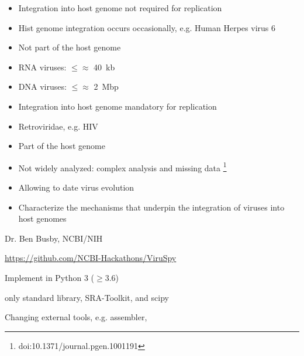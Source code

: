 \documentclass[final, a0paper, portrait]{baposter}
\newcommand{\compresslist}{
    \setlength{\itemsep}{1pt}
    \setlength{\parskip}{0pt}
    \setlength{\parsep}{0pt}
}
\begin{document}
\begin{poster}
{}
{
  \begin{minipage}{0.5\textwidth}
    \resizebox{0.7\linewidth}{!}{}
    \begin{itemize}
      \compresslist
      \item Integration into host genome not required for replication
      \item Hist genome integration occurs occasionally, e.g. Human Herpes virus 6
      \item Not part of the host genome
      \item RNA viruses: $\le \approx$ 40~kb
      \item DNA viruses: $\le \approx$ 2~Mbp
    \end{itemize}
  \end{minipage}
  \begin{minipage}{0.5\textwidth}
    \resizebox{0.7\linewidth}{!}{}
    \begin{itemize}
      \compresslist
      \item Integration into host genome mandatory for replication
      \item Retroviridae, e.g. HIV
      \item Part of the host genome
      \item Not widely analyzed: complex analysis and missing data
            \footnote{doi:10.1371/journal.pgen.1001191}
      \item Allowing to date virus evolution
      \item Characterize the mechanisms that underpin the integration of
            viruses into host genomes
    \end{itemize}
  \end{minipage}
}
{
  \begin{minipage}{0.6\textwidth}
    \begin{description}
      \compresslist
      \item[Collaboration] Dr. Ben Busby, NCBI/NIH
      \item[Built on ViruSpy] \url{https://github.com/NCBI-Hackathons/ViruSpy}
      \item[Modern] Implement in Python 3 ($\geq$3.6)
      \item[Independent] only standard library, SRA-Toolkit, and scipy
      \item[Modular] Changing external tools, e.g. assembler,

\end{description}
\end{minipage}}
\end{poster}
\end{document}
